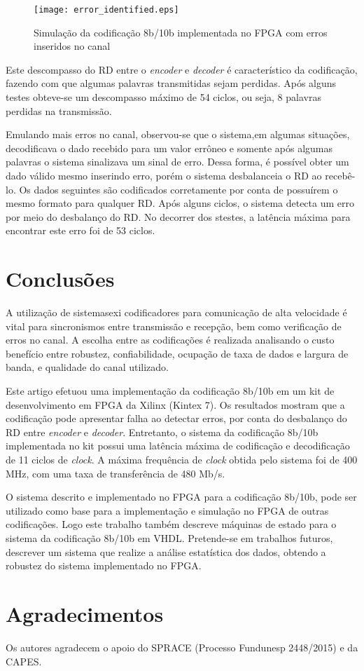 \documentclass[11pt,twocolumn]{article}
\begin{document}
\begin{figure}[htb]
	\centering
	\texttt{[image: error\_identified.eps]}
	\caption{Simulação da codificação 8b/10b implementada no FPGA com erros inseridos no canal}
	\label{errodetected}
\end{figure}

Este descompasso do RD entre o \textit{encoder} e \textit{decoder} é característico da codificação, fazendo com que algumas palavras transmitidas sejam perdidas. Após alguns testes obteve-se um descompasso máximo de 54 ciclos, ou seja, 8 palavras perdidas na transmissão.

Emulando mais erros no canal, observou-se que o sistema,em algumas situações, decodificava o dado recebido para um valor errôneo e somente após algumas palavras o sistema sinalizava um sinal de erro. Dessa forma, é possível obter um dado válido mesmo inserindo erro, porém o sistema desbalanceia o RD ao recebê-lo. Os dados seguintes são codificados corretamente por conta de possuírem o mesmo formato para qualquer RD. Após alguns ciclos, o sistema detecta um erro por meio do desbalanço do RD. No decorrer dos stestes, a latência máxima para encontrar este erro foi de 53 ciclos.

\section{Conclusões}

A utilização de sistemasexi codificadores para comunicação de alta velocidade é vital para sincronismos entre transmissão e recepção, bem como verificação de erros no canal. A escolha entre as codificações é realizada analisando o custo benefício entre robustez, confiabilidade, ocupação de taxa de dados e largura de banda, e qualidade do canal utilizado.

Este artigo efetuou uma implementação da codificação 8b/10b em um kit de desenvolvimento em FPGA da Xilinx (Kintex 7). Os resultados mostram que a codificação pode apresentar falha ao detectar erros, por conta do desbalanço do RD entre \textit{encoder} e \textit{decoder}. Entretanto, o sistema da codificação 8b/10b implementada no kit possui uma latência máxima de codificação e decodificação de 11 ciclos de \textit{clock}. A máxima frequência de \textit{clock} obtida pelo sistema foi de 400 MHz, com uma taxa de transferência de 480 Mb/s.

O sistema descrito e implementado no FPGA para a codificação 8b/10b, pode ser utilizado como base para a implementação e simulação no FPGA de outras codificações.   Logo este trabalho também descreve máquinas de estado para o sistema da codificação 8b/10b em VHDL. Pretende-se em trabalhos futuros, descrever um sistema que realize a análise estatística dos dados, obtendo a robustez do sistema implementado no FPGA.

\section*{Agradecimentos}

Os autores agradecem o apoio do SPRACE (Processo Fundunesp 2448/2015) e da CAPES.



\end{document}
